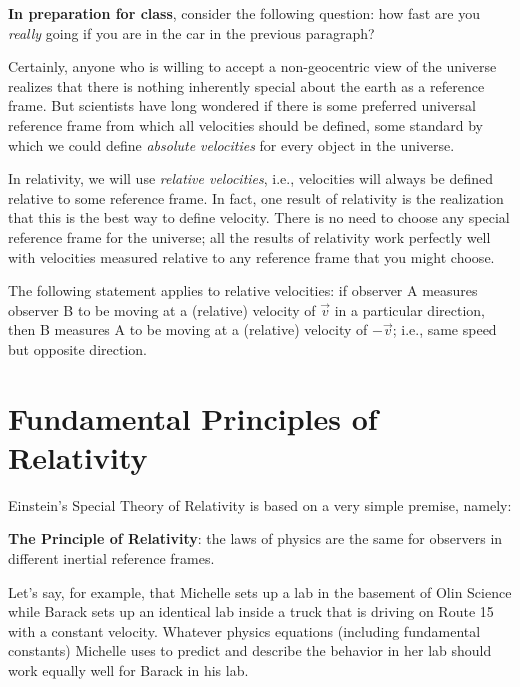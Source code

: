 \begin{lemma}\textbf{In preparation for class}, consider the following question: how
fast are you \emph{really} going if you are in the car in the previous
paragraph?\end{lemma}
   
Certainly, anyone who is willing to accept a non-geocentric view of
the universe realizes that there is nothing inherently special about
the earth as a reference frame.  But scientists have long wondered if
there is some preferred universal reference frame from which all
velocities should be defined, some standard by which we could define
\emph{absolute velocities} for every object in the universe.
   
In relativity, we will use \emph{relative velocities}, i.e.,
velocities will always be defined relative to some reference frame.
In fact, one result of relativity is the realization that this is the
best way to define velocity.  There is no need to choose any special
reference frame for the universe; all the results of relativity work
perfectly well with velocities measured relative to any reference
frame that you might choose.
   
The following statement applies to relative velocities: if observer A
measures observer B to be moving at a (relative) velocity of $\vec{v}$
in a particular direction, then B measures A to be moving at a
(relative) velocity of $-\vec{v}$; i.e., same speed but opposite
direction.

\section{Fundamental Principles of Relativity}

Einstein's Special Theory of Relativity is based on a very simple
premise, namely:


\begin{lemma}\textbf{The Principle of Relativity}: the laws of
    physics are the same for observers in different inertial reference
    frames.\end{lemma}

 Let's say, for example, that Michelle sets up a lab in the
basement of Olin Science while Barack sets up an identical lab inside
a truck that is driving on Route 15 with a constant velocity.
Whatever physics equations (including fundamental constants) Michelle
uses to predict and describe the behavior in her lab should work
equally well for Barack in his lab.

